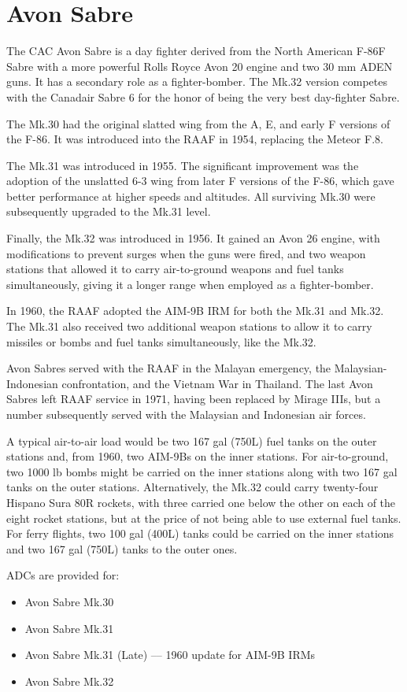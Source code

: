 \section*{Avon Sabre}

The CAC Avon Sabre is a day fighter derived from the North American F-86F Sabre with a more powerful Rolls Royce Avon 20 engine and two 30 mm ADEN guns. It has a secondary role as a fighter-bomber. The Mk.32 version competes with the Canadair Sabre 6 for the honor of being the very best day-fighter Sabre.

The Mk.30 had the original slatted wing from the A, E, and early F versions of the F-86. It was introduced into the RAAF in 1954, replacing the Meteor F.8.

The Mk.31 was introduced in 1955. The significant improvement was the adoption of the unslatted 6-3 wing from later F versions of the F-86, which gave better performance at higher speeds and altitudes. All surviving Mk.30 were subsequently upgraded to the Mk.31 level. 

Finally, the Mk.32 was introduced in 1956. It gained an Avon 26 engine, with modifications to prevent surges when the guns were fired, and two weapon stations that allowed it to carry air-to-ground weapons and fuel tanks simultaneously, giving it a longer range when employed as a fighter-bomber.

In 1960, the RAAF adopted the AIM-9B IRM for both the Mk.31 and Mk.32. The Mk.31 also received two additional weapon stations to allow it to carry missiles or bombs and fuel tanks simultaneously, like the Mk.32.

Avon Sabres served with the RAAF in the Malayan emergency, the Malaysian-Indonesian confrontation, and the Vietnam War in Thailand. The last Avon Sabres left RAAF service in 1971, having been replaced by Mirage IIIs, but a number subsequently served with the Malaysian and Indonesian air forces.

A typical air-to-air load would be two 167 gal (750L) fuel tanks on the outer stations and, from 1960, two AIM-9Bs on the inner stations. For air-to-ground, two 1000 lb bombs might be carried on the inner stations along with two 167 gal tanks on the outer stations. Alternatively, the Mk.32 could carry twenty-four Hispano Sura 80R rockets, with three carried one below the other on each of the eight rocket stations, but at the price of not being able to use external fuel tanks. For ferry flights, two 100 gal (400L) tanks could be carried on the inner stations and two 167 gal (750L) tanks to the outer ones.

ADCs are provided for:
\begin{itemize}
\item Avon Sabre Mk.30
\item Avon Sabre Mk.31
\item Avon Sabre Mk.31 (Late) –– 1960 update for AIM-9B IRMs
\item Avon Sabre Mk.32
\end{itemize}
